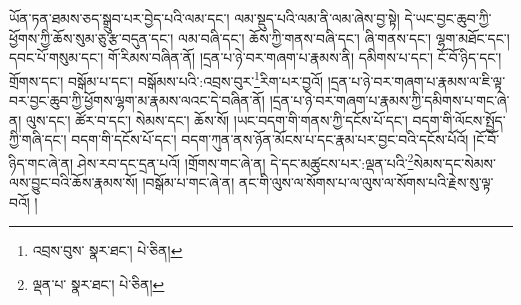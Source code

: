 ཡོན་ཏན་ཐམས་ཅད་སྒྲུབ་པར་བྱེད་པའི་ལམ་དང་། ལམ་སྡུད་པའི་ལམ་ནི་ལམ་ཞེས་བྱ་སྟེ། དེ་ཡང་བྱང་ཆུབ་ཀྱི་ཕྱོགས་ཀྱི་ཆོས་སུམ་ཅུ་རྩ་བདུན་དང་། ལམ་བཞི་དང་། ཆོས་ཀྱི་གནས་བཞི་དང་། ཞི་གནས་དང་། ལྷག་མཐོང་དང་། དབང་པོ་གསུམ་དང་། གོ་རིམས་བཞིན་ནོ། །དྲན་པ་ཉེ་བར་གཞག་པ་རྣམས་ནི། དམིགས་པ་དང་། ངོ་བོ་ཉིད་དང་། གྲོགས་དང་། བསྒོམ་པ་དང་། བསྒོམས་པའི་:འབྲས་བུར་\footnote{འབྲས་བུས་  སྣར་ཐང་།  པེ་ཅིན། }རིག་པར་བྱའོ། །དྲན་པ་ཉེ་བར་གཞག་པ་རྣམས་ལ་ཇི་ལྟ་བར་བྱང་ཆུབ་ཀྱི་ཕྱོགས་ལྷག་མ་རྣམས་ལའང་དེ་བཞིན་ནོ། །དྲན་པ་ཉེ་བར་གཞག་པ་རྣམས་ཀྱི་དམིགས་པ་གང་ཞེ་ན། ལུས་དང་། ཚོར་བ་དང་། སེམས་དང་། ཆོས་སོ། །ཡང་བདག་གི་གནས་ཀྱི་དངོས་པོ་དང་། བདག་གི་ལོངས་སྤྱོད་ཀྱི་གཞི་དང་། བདག་གི་དངོས་པོ་དང་། བདག་ཀུན་ནས་ཉོན་མོངས་པ་དང་རྣམ་པར་བྱང་བའི་དངོས་པོའོ། །ངོ་བོ་ཉིད་གང་ཞེ་ན། ཤེས་རབ་དང་དྲན་པའོ། །གྲོགས་གང་ཞེ་ན། དེ་དང་མཚུངས་པར་:ལྡན་པའི་\footnote{ལྡན་པ་  སྣར་ཐང་།  པེ་ཅིན། }སེམས་དང་སེམས་ལས་བྱུང་བའི་ཆོས་རྣམས་སོ། །བསྒོམ་པ་གང་ཞེ་ན། ནང་གི་ལུས་ལ་སོགས་པ་ལ་ལུས་ལ་སོགས་པའི་རྗེས་སུ་ལྟ་བའོ། །
